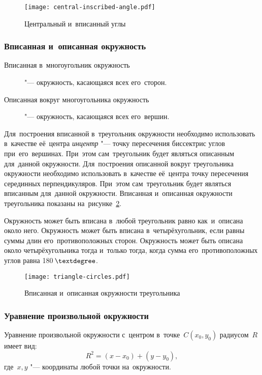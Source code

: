 \documentclass[]{scrartcl}
\begin{document}
\begin{figure}[ht]
	\centering %
	\texttt{[image: central-inscribed-angle.pdf]}
	\caption{Центральный и~вписанный углы}\label{fig:central-inscribed-angle}
\end{figure}

\subsubsection{Вписанная и~описанная окружность}
\begin{description}
	\item[Вписанная в~многоугольник окружность] "--- окружность, касающаяся всех его~сторон.
\end{description}
\begin{description}
	\item[Описанная вокруг многоугольника окружность] "--- окружность, касающаяся всех его~вершин.
\end{description}
Для~построения вписанной в~треугольник окружности необходимо использовать в~качестве её~центра \emph{инцентр} "--- точку пересечения биссектрис углов при~его~вершинах. При~этом сам~треугольник будет являться описанным для~данной окружности. Для~построения описанной вокруг треугольника окружности необходимо использовать в~качестве её~центра  точку пересечения серединных перпендикуляров. При~этом сам~треугольник будет являться вписанным для~данной окружности. Вписанная и~описанная окружности треугольника показаны на~рисунке~\ref{fig:triangle-circles}.

Окружность может быть вписана в~любой треугольник равно как~и~описана около него. Окружность может быть вписана в~четырёхугольник, если равны суммы длин его~противоположных сторон. Окружность может быть описана около четырёхугольника тогда и~только тогда, когда сумма его~противоположных углов равна 180\,$\textdegree$.

\begin{figure}[ht]
\centering %
\texttt{[image: triangle-circles.pdf]}
\caption{Вписанная и~описанная окружности треугольника}\label{fig:triangle-circles}
\end{figure}

\subsubsection{Уравнение произвольной окружности}
Уравнение произвольной окружности с~центром в~точке~${\textstyle C(x_0,y_0)}$ радиусом~${\textstyle R}$ имеет вид:
\begin{equation}\label{eq:circle-equation-2}
R^2=(x-x_0)+(y-y_0),
\end{equation}
где~${\textstyle x,y}$ "--- координаты любой точки на~окружности.
\end{document}
